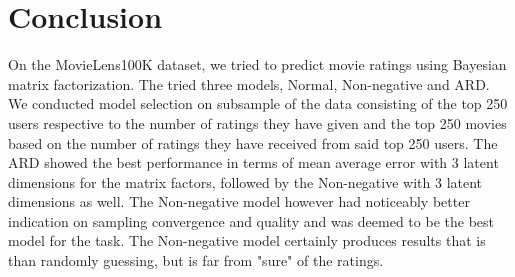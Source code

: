 \documentclass[12pt]{article}
\begin{document}
\section{Conclusion}
On the MovieLens100K dataset, we tried to predict movie ratings using Bayesian matrix factorization. The tried three models, Normal, Non-negative and ARD. We conducted model selection on subsample of the data consisting of the top 250 users respective to the number of ratings they have given and the top 250 movies based on the number of ratings they have received from said top 250 users. The ARD showed the best performance in terms of mean average error with $3$ latent dimensions for the matrix factors, followed by the Non-negative with $3$ latent dimensions as well. The Non-negative model however had noticeably better indication on sampling convergence and quality and was deemed to be the best model for the task. The Non-negative model certainly produces results that is  than randomly guessing, but is far from "sure" of the ratings.

% 


\end{document}
